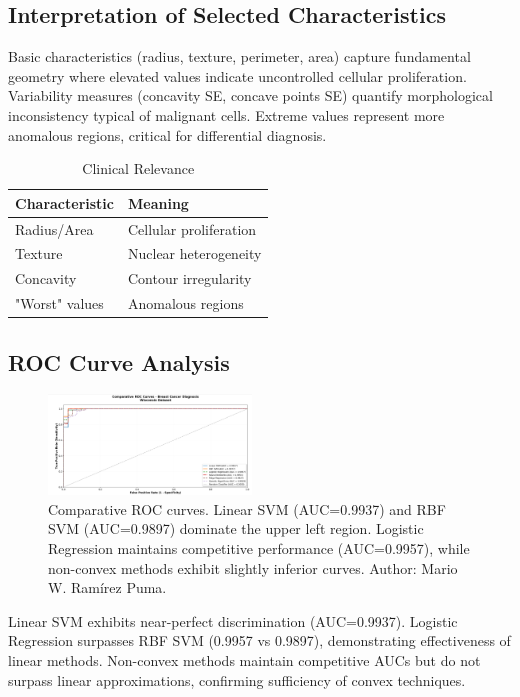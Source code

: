\documentclass[conference]{IEEEtran}
\begin{document}
\subsection{Interpretation of Selected Characteristics}

Basic characteristics (radius, texture, perimeter, area) capture fundamental geometry where elevated values indicate uncontrolled cellular proliferation. Variability measures (concavity SE, concave points SE) quantify morphological inconsistency typical of malignant cells. Extreme values represent more anomalous regions, critical for differential diagnosis.

\begin{table}[htbp]
\caption{Clinical Relevance}
\begin{center}
\footnotesize
\begin{tabular}{ll}
\toprule
Characteristic & Meaning \\
\midrule
Radius/Area & Cellular proliferation \\
Texture & Nuclear heterogeneity \\
Concavity & Contour irregularity \\
"Worst" values & Anomalous regions \\
\bottomrule
\end{tabular}
\label{tab8}
\end{center}
\end{table}

\subsection{ROC Curve Analysis}

\begin{figure}[htbp]
\centering
\includegraphics[width=0.48\textwidth]{roc.png}
\caption{Comparative ROC curves. Linear SVM (AUC=0.9937) and RBF SVM (AUC=0.9897) dominate the upper left region. Logistic Regression maintains competitive performance (AUC=0.9957), while non-convex methods exhibit slightly inferior curves. Author: Mario W. Ramírez Puma.}
\label{fig:roc_curves}
\end{figure}

Linear SVM exhibits near-perfect discrimination (AUC=0.9937). Logistic Regression surpasses RBF SVM (0.9957 vs 0.9897), demonstrating effectiveness of linear methods. Non-convex methods maintain competitive AUCs but do not surpass linear approximations, confirming sufficiency of convex techniques.
\end{document}

